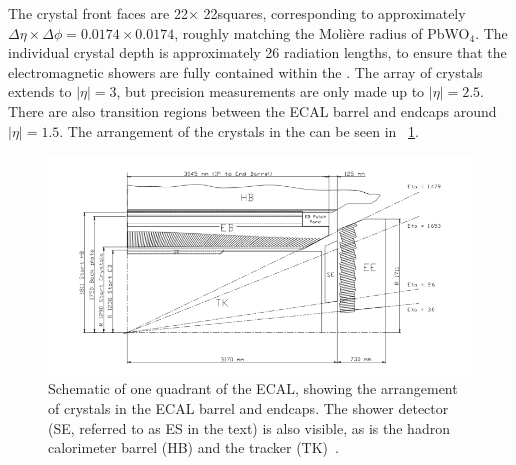 The \ECAL crystal front faces are 22\mm $\times$ 22\mm squares, corresponding to approximately $\Delta \eta \times \Delta \phi = 0.0174 \times 0.0174$, roughly matching the Moli\`ere radius of PbWO$_4$. The individual crystal depth is approximately 26 radiation lengths, to ensure that the electromagnetic showers are fully contained within the \ECAL. The array of crystals extends to $|\eta| = 3$, but precision measurements are only made up to $|\eta| =2.5$. There are also transition regions between the ECAL barrel and endcaps around $|\eta| = 1.5$. The arrangement of the crystals in the \ECAL can be seen in \Fig~\ref{fig:ecal}.

\begin{figure}[h]
\centering
\includegraphics[width=1.0\textwidth]{detectorFigures/ecalEBEE.png}
\caption[Schematic \crosssection of one quadrant of the ECAL, showing the arrangement of crystals in the ECAL barrel and endcaps. The shower detector (SE, referred to as ES in the text) is also visible, as is the hadron calorimeter barrel (HB) and the tracker (TK)\quad\cite{CMSEcalTDR}.]{Schematic \crosssection of one quadrant of the ECAL, showing the arrangement of crystals in the ECAL barrel and endcaps. The shower detector (SE, referred to as ES in the text) is also visible, as is the hadron calorimeter barrel (HB) and the tracker (TK)~\cite{CMSEcalTDR}.}
\label{fig:ecal}
\end{figure}








